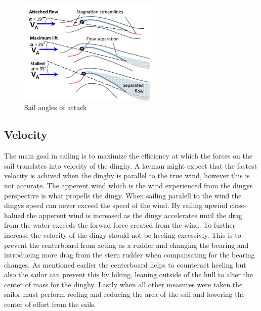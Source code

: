 \begin{figure}[H]
\centering
\includegraphics[width=0.6\textwidth]{Figures/max_lift.jpg}
\caption{Sail angles of attack}
\label{max_liftl}
\end{figure}
\subsection{Velocity}
The main goal in sailing is to maximize the efficiency at which the forces on the sail translates into velocity of the dinghy. A layman might expect that the fastest velocity is achived when the dinghy is parallel to the true wind, however this is not accurate. The apperent wind which is the wind experienced from the dingys perspective is what propells the dingy. When sailing paralell to the wind the dingys speed can never exceed the speed of the wind\cite{sail-force}. By sailing upwind close-halued the apperent wind is increased as the dingy accelerates until the drag from the water exceeds the forwad force created from the wind. To further increase the velocity of the dingy should not be heeling excessivly. This is to prevent the centerboard from acting as a rudder and changing the bearing and introducing more drag from the stern rudder when compansating for the bearing changes. As mentioned earlier the centerboard helps to counteract heeling but also the sailor can prevent this by hiking, leaning outside of the hull to alter the center of mass for the dinghy. Lastly when all other measures were taken the sailor must perform reefing and reducing the area of the sail and lowering the center of effort from the sails.